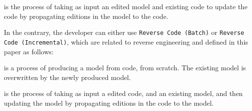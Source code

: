 


\begin{definition}
	 is the process
	of taking as input an edited model and existing code to update the code by propagating
	editions in the model to the code.
\end{definition}

In the contrary, the developer can either use \texttt{Reverse Code (Batch)} or \texttt{Reverse Code (Incremental)}, which are related to reverse engineering and defined in this paper as follows:

\begin{definition}
	 is a process of producing a model from code, from scratch.
	The existing model is overwritten by the newly produced model.
\end{definition}

\begin{definition}
	 is the process of taking as
	input a edited code, and an existing model, and then updating the model by propagating
	editions in the code to the model.
\end{definition}


